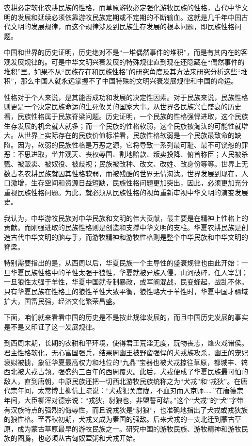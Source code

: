 \par 农耕必定软化农耕民族的性格，而草原游牧必定强化游牧民族的性格，古代中华文明的发展和延续必须依靠游牧民族定期或不定期的不断输血。这就是几千年中国古代文明的发展规律，而这个规律涉及到民族生存发展的根本问题，即民族性格问题。
\par 中国和世界的历史证明，历史绝对不是“一堆偶然事件的堆积”，而是有其内在的客观发展规律的。可是中华文明兴衰发展的特殊规律直到现在还隐藏在“偶然事件的堆积”里。如果不从“民族存在和民族性格”的研究角度及其方法来研究分析这些“堆积”，那么中国人就永远掌握不了中国特殊的文明兴衰发展规律和中国的命运。
\par 性格对于个人来说，是其能否成功和发展的决定性因素。对于民族来说，民族性格则更是一个决定民族命运的生死攸关的国家大事。从世界各民族兴亡盛衰的历史看，民族性格属于民族脊梁问题。历史证明，一个民族的性格强悍进取，这个民族生存发展的机会就大就多；而一个民族的性格软弱，这个民族被淘汰的可能性就增大。从世界上实际存在的民族价值标准看，民族性格软弱是一个民族最致命的缺陷。因为，软弱的民族性格是万恶之源，它将导致一系列最可耻、最不可饶恕的罪恶：不思进取，坐井观天、丧权辱国、割地赔款、叛卖投降、俯首称臣；人民被杀戮、被贩卖、被奴役、被歧视；民族被改种、改文、改姓、改身份等等。世界上无数古老农耕民族就因其性格软弱，而被残酷的世界无情淘汰。世界发展到现在，人口激增，生存空间和资源日益短缺，民族性格问题更加突出，因此，必须更加充分重视民族性格问题。为此，就必须从民族性格的视角重新审视中华文明的演变发展史。
\par 我认为，中华游牧民族对中华民族和文明的伟大贡献，最主要是在精神上性格上的贡献。而刚强进取的民族性格则是创造和支撑中华文明的支柱。华夏农耕民族是创造古代中华文明的脑与手，而游牧精神和游牧性格则是整个中华民族和中华文明的脊梁。
\par 特别需要指出的是，从西周以后，华夏民族一个主导性的盛衰规律也由此开始：一旦华夏民族性格中的羊性太强于狼性，华夏就被异族入侵，山河破碎，任人宰割；一旦狼性太强于羊性，华夏中国就专制暴政，或军阀混战，民变蜂起，战乱不休。只有华夏民族在性格上的狼性羊性大致平衡，狼性略大于羊性时，华夏中国才疆域扩大，国富民强，经济文化繁荣昌盛。
\par 下面，咱们就来看看中国的历史是不是按此规律发展的，而且中国历史发展的事实是不是又印证了这一发展规律。
\par 到西周末期，长期的农耕和平环境，使得君王荒淫无度，玩物丧志，烽火戏诸侯。君主性格软化，无心富国强兵，结果周幽王被野蛮强悍的犬戎族攻杀，幽王的宠妃褒姒被掳，象征华夏最高权力和地位的“九鼎”宝器也被犬戎掠往草原，都城丰、镐西北被犬戎占领。强盛约三百年的西周覆灭。此后，犬戎便成了华夏民族最可怕的敌人，直到唐朝，中原民族还把一切西北游牧民族统称之为“犬戎”和“戎狄”。在唐代宗年间，太常博士柳伉上疏说：“犬戎犯关度陇，不血刃而入京师……”在唐德宗年间，大臣柳浑对德宗说：“戎狄，豺狼也，非盟誓可结。”这个“犬戎”的“犬”字带有汉族特点的强烈的侮辱性，而且说戎狄是“豺狼”，也准确地指出了犬戎或戎狄族的狼性格。至春秋初期，犬戎又成为秦国的强敌。后来犬戎的一支北迁到蒙古草原，成为蒙古草原最早的游牧民族之一。研究中国的游牧民族、游牧精神和游牧民族的图腾，也必须从古匈奴荤粥和犬戎开始。

